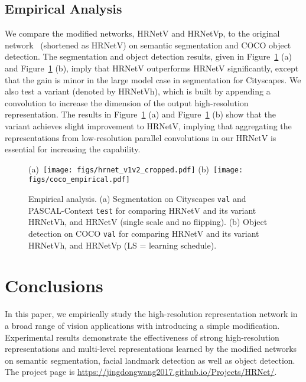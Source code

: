\documentclass[10pt,twocolumn,letterpaper]{article}
\begin{document}
\subsection{Empirical Analysis}
\label{sec:empiricalstudy}
We compare the modified networks, HRNetV and HRNetVp,
to the original network~\cite{SunXLW19} (shortened as HRNetV)
on semantic segmentation and COCO object detection.
The segmentation and object detection results, given in
Figure~\ref{fig:empiricalstudy} (a)
and Figure~\ref{fig:empiricalstudy} (b),
imply that HRNetV outperforms HRNetV significantly,
except that
the gain is minor
in the large model case
in segmentation for Cityscapes.
We also test a variant
(denoted by HRNetVh),
which is built by appending a  convolution to
increase the dimension of the output high-resolution representation.
The results in Figure~\ref{fig:empiricalstudy} (a) and Figure~\ref{fig:empiricalstudy} (b)
show that the variant achieves slight improvement
to HRNetV,
implying that aggregating the representations
from low-resolution parallel convolutions in our HRNetV
is essential for increasing the capability.

\begin{figure}[t]
    \centering
    \footnotesize
    (a)~\texttt{[image: figs/hrnet\_v1v2\_cropped.pdf]}
    (b)~\texttt{[image: figs/coco\_empirical.pdf]}
    \caption{Empirical analysis.
    (a) Segmentation on Cityscapes \texttt{val} and PASCAL-Context \texttt{test} for comparing HRNetV and its variant HRNetVh, and HRNetV (single scale and no flipping).
    (b) Object detection on COCO \texttt{val} for comparing HRNetV and its variant HRNetVh, and HRNetVp (LS = learning schedule).}
    \label{fig:empiricalstudy}
    \vspace{-0.3cm}
\end{figure}

\section{Conclusions}
In this paper,
we empirically study
the high-resolution representation network
in a broad range of vision applications
with introducing a simple modification.
Experimental results demonstrate
the effectiveness of strong high-resolution representations
and multi-level representations
learned by the modified networks
on semantic segmentation, facial landmark detection
as well as object detection.
The project page is \url{https://jingdongwang2017.github.io/Projects/HRNet/}.
\end{document}
